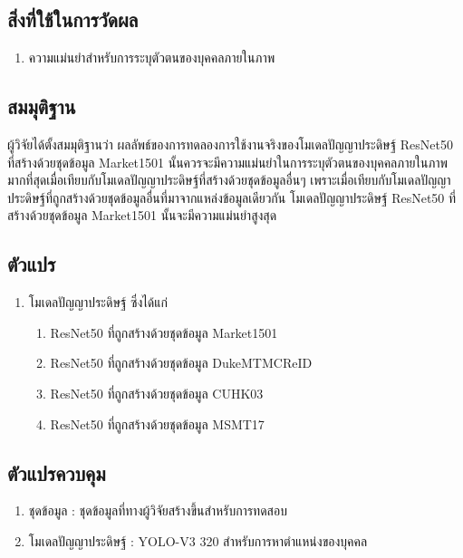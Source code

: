 \subsection*{สิ่งที่ใช้ในการวัดผล}
	\begin{enumerate}
		\setlength\itemsep{-0.25em}
		\item ความแม่นยำสำหรับการระบุตัวตนของบุคคลภายในภาพ
	\end{enumerate}
\subsection*{สมมุติฐาน}
ผู้วิจัยได้ตั้งสมมุติฐานว่า ผลลัพธ์ของการทดลองการใช้งานจริงของโมเดลปัญญาประดิษฐ์ ResNet50 ที่สร้างด้วยชุดข้อมูล Market1501 
นั้นควรจะมีความแม่นยำในการระบุตัวตนของบุคคลภายในภาพมากที่สุดเมื่อเทียบกับโมเดลปัญญาประดิษฐ์ที่สร้างด้วยชุดข้อมูลอื่นๆ
เพราะเมื่อเทียบกับโมเดลปัญญาประดิษฐ์ที่ถูกสร้างด้วยชุดข้อมูลอื่นที่มาจากแหล่งข้อมูลเดียวกัน โมเดลปัญญาประดิษฐ์ ResNet50 ที่สร้างด้วยชุดข้อมูล Market1501 นั้นจะมีความแม่นยำสูงสุด
\subsection*{ตัวแปร}
	\begin{enumerate}
		\setlength\itemsep{-0.25em}
		\item โมเดลปัญญาประดิษฐ์ ซึ่งได้แก่
		\begin{enumerate}
			\setlength\itemsep{-0.25em}
			\item ResNet50 ที่ถูกสร้างด้วยชุดข้อมูล Market1501
			\item ResNet50 ที่ถูกสร้างด้วยชุดข้อมูล DukeMTMCReID
			\item ResNet50 ที่ถูกสร้างด้วยชุดข้อมูล CUHK03	
			\item ResNet50 ที่ถูกสร้างด้วยชุดข้อมูล MSMT17
		\end{enumerate}
	\end{enumerate}
\subsection*{ตัวแปรควบคุม}
	\begin{enumerate}
		\setlength\itemsep{-0.25em}
		\item ชุดข้อมูล : ชุดข้อมูลที่ทางผู้วิจัยสร้างขึ้นสำหรับการทดสอบ
		\item โมเดลปัญญาประดิษฐ์ : YOLO-V3 320  สำหรับการหาตำแหน่งของบุคคล
	\end{enumerate}
